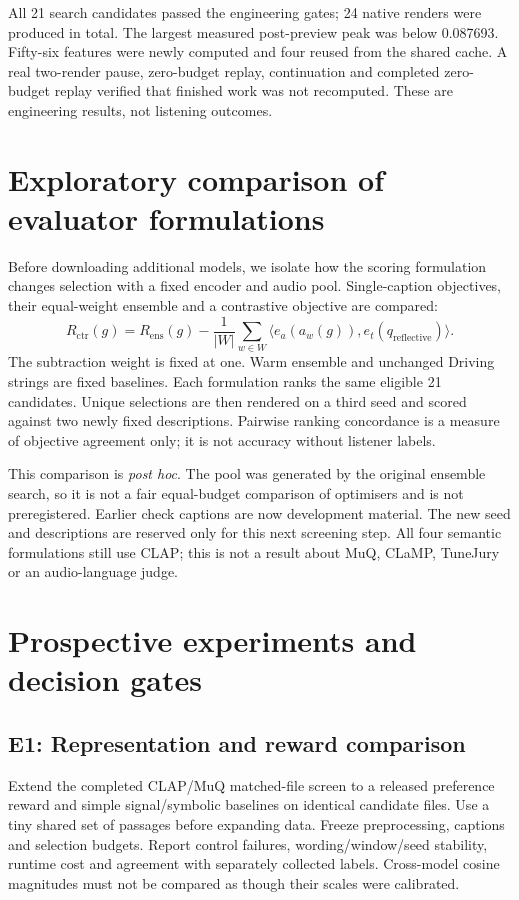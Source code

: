 \documentclass[11pt]{article}
\begin{document}
All 21 search candidates passed the engineering gates; 24 native renders were produced in total. The largest measured post-preview peak was below 0.087693. Fifty-six features were newly computed and four reused from the shared cache. A real two-render pause, zero-budget replay, continuation and completed zero-budget replay verified that finished work was not recomputed. These are engineering results, not listening outcomes.

\section{Exploratory comparison of evaluator formulations}
\label{sec:comparison}
Before downloading additional models, we isolate how the scoring formulation changes selection with a fixed encoder and audio pool. Single-caption objectives, their equal-weight ensemble and a contrastive objective are compared:
\begin{equation}
 R_{\mathrm{ctr}}(g)=R_{\mathrm{ens}}(g)-\frac{1}{|W|}\sum_{w\in W}
 \langle e_a(a_w(g)),e_t(q_{\mathrm{reflective}})\rangle.
\end{equation}
The subtraction weight is fixed at one. Warm ensemble and unchanged Driving strings are fixed baselines. Each formulation ranks the same eligible 21 candidates. Unique selections are then rendered on a third seed and scored against two newly fixed descriptions. Pairwise ranking concordance is a measure of objective agreement only; it is not accuracy without listener labels.

This comparison is \emph{post hoc}. The pool was generated by the original ensemble search, so it is not a fair equal-budget comparison of optimisers and is not preregistered. Earlier check captions are now development material. The new seed and descriptions are reserved only for this next screening step. All four semantic formulations still use CLAP; this is not a result about MuQ, CLaMP, TuneJury or an audio-language judge.





\section{Prospective experiments and decision gates}
\subsection{E1: Representation and reward comparison}
Extend the completed CLAP/MuQ matched-file screen to a released preference reward and simple signal/symbolic baselines on identical candidate files. Use a tiny shared set of passages before expanding data. Freeze preprocessing, captions and selection budgets. Report control failures, wording/window/seed stability, runtime cost and agreement with separately collected labels. Cross-model cosine magnitudes must not be compared as though their scales were calibrated.
\end{document}
